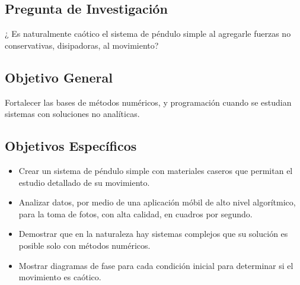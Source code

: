 \documentclass[aps,twocolumn,secnumarabic,nobalancelastpage,amsmath,amssymb,nofootinbib]{revtex4-1}
\begin{document}
		
		
		\subsection{Pregunta de Investigaci\'on}
			¿%
			Es naturalmente ca\'otico el sistema de p\'endulo simple al agregarle fuerzas no conservativas, disipadoras, al movimiento?  
		\subsection{Objetivo General}
			Fortalecer las bases de m\'etodos num\'ericos, y programaci\'on cuando se estudian sistemas con soluciones no anal\'iticas. 
		\subsection{Objetivos Espec\'ificos}
			\begin{itemize}
				\item Crear un sistema de p\'endulo simple con materiales caseros que permitan el estudio detallado de su movimiento. %
				\item Analizar datos, por medio de una aplicaci\'on m\'obil de alto nivel algor\'itmico, para la toma de fotos, con alta calidad, en cuadros por segundo.
				\item Demostrar que en la naturaleza hay sistemas complejos que su soluci\'on es posible solo con m\'etodos num\'ericos.
				\item Mostrar diagramas de fase para cada condici\'on inicial para determinar si el movimiento es ca\'otico. 
			\end{itemize}
				
\end{document}
